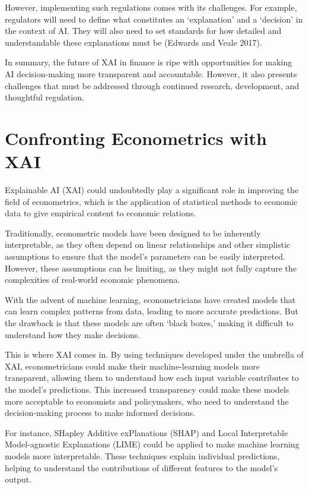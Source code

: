 \documentclass[
  letterpaper,
  DIV=11,
  numbers=noendperiod]{scrartcl}
\begin{document}
However, implementing such regulations comes with its challenges. For
example, regulators will need to define what constitutes an
`explanation' and a `decision' in the context of AI. They will also need
to set standards for how detailed and understandable these explanations
must be (Edwards and Veale 2017).

In summary, the future of XAI in finance is ripe with opportunities for
making AI decision-making more transparent and accountable. However, it
also presents challenges that must be addressed through continued
research, development, and thoughtful regulation.

\hypertarget{confronting-econometrics-with-xai}{%
\section{Confronting Econometrics with
XAI}\label{confronting-econometrics-with-xai}}

Explainable AI (XAI) could undoubtedly play a significant role in
improving the field of econometrics, which is the application of
statistical methods to economic data to give empirical content to
economic relations.

Traditionally, econometric models have been designed to be inherently
interpretable, as they often depend on linear relationships and other
simplistic assumptions to ensure that the model's parameters can be
easily interpreted. However, these assumptions can be limiting, as they
might not fully capture the complexities of real-world economic
phenomena.

With the advent of machine learning, econometricians have created models
that can learn complex patterns from data, leading to more accurate
predictions. But the drawback is that these models are often `black
boxes,' making it difficult to understand how they make decisions.

This is where XAI comes in. By using techniques developed under the
umbrella of XAI, econometricians could make their machine-learning
models more transparent, allowing them to understand how each input
variable contributes to the model's predictions. This increased
transparency could make these models more acceptable to economists and
policymakers, who need to understand the decision-making process to make
informed decisions.

For instance, SHapley Additive exPlanations (SHAP) and Local
Interpretable Model-agnostic Explanations (LIME) could be applied to
make machine learning models more interpretable. These techniques
explain individual predictions, helping to understand the contributions
of different features to the model's output.
\end{document}
